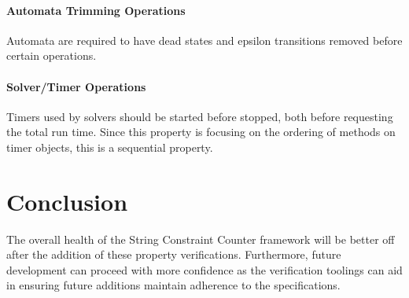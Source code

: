 \documentclass[letterpaper,11pt,twocolumn]{article}
\begin{document}
\paragraph{Automata Trimming Operations} Automata are required to have dead states and epsilon
transitions removed before certain operations.

\paragraph{Solver/Timer Operations} Timers used by solvers should be started before stopped,
both before requesting the total run time.  Since this property is focusing on
the ordering of methods on timer objects, this is a sequential property.

\section{Conclusion}

The overall health of the String Constraint Counter framework will be better
off after the addition of these property verifications.  Furthermore, future
development can proceed with more confidence as the verification toolings can
aid in ensuring future additions maintain adherence to the specifications.



\end{document}
